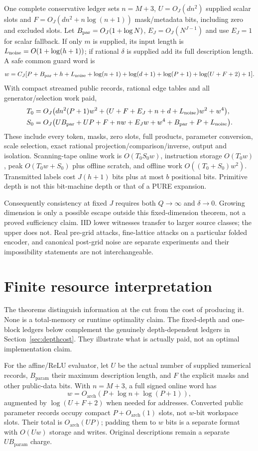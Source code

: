 \documentclass[11pt,letterpaper]{article}
\theoremstyle{definition}\newtheorem{definition}[theorem]{Definition}
\theoremstyle{remark}\newtheorem{remark}[theorem]{Remark}
\begin{document}
One complete conservative ledger sets $n=M+3$, $U=O_J(dn^2)$ supplied scalar slots and $F=O_J(dn^2+n\log(n+1))$ mask/metadata bits, including zero and excluded slots. Let $B_{\rm par}=O_J(1+\log N)$, $E_J=O_J(N^{J-1})$ and use $E_J=1$ for scalar fallback. If only $m$ is supplied, its input length is $L_{\rm noise}=O(1+\log(h+1))$; if rational $\delta$ is supplied add its full description length. A safe common guard word is
\[
 w=C_J[P+B_{\rm par}+h+L_{\rm noise}+\log(n+1)+\log(d+1)
       +\log(P+1)+\log(U+F+2)+1].
\]
With compact streamed public records, rational edge tables and all generator/selection work paid,
\begin{align*}
 T_0&=O_J\bigl(dn^2(P+1)w^2+(U+F+E_J+n+d+L_{\rm noise})w^2+w^4\bigr),\\
 S_0&=O_J\bigl(UB_{\rm par}+UP+F+nw+E_Jw+w^4+B_{\rm par}+P+L_{\rm noise}\bigr).
\end{align*}
These include every token, masks, zero slots, full products, parameter conversion, scale selection, exact rational projection/comparison/inverse, output and isolation. Scanning-tape online work is $O(T_0S_0w)$, instruction storage $O(T_0w)$, peak $O(T_0w+S_0)$ plus offline scratch, and offline work $O((T_0+S_0)w^2)$. Transmitted labels cost $J(h+1)$ bits plus at most $b$ positional bits. Primitive depth is not this bit-machine depth or that of a PURE expansion.

Consequently consistency at fixed $J$ requires both $Q\to\infty$ and $\delta\to0$. Growing dimension is only a possible escape outside this fixed-dimension theorem, not a proved sufficiency claim. IID lower witnesses transfer to larger source classes; the upper does not. Real pre-grid attacks, fine-lattice attacks on a particular folded encoder, and canonical post-grid noise are separate experiments and their impossibility statements are not interchangeable.

\section{Finite resource interpretation}\label{sec:costs}
The theorems distinguish information at the cut from the cost of producing it. None is a total-memory or runtime optimality claim. The fixed-depth and one-block ledgers below complement the genuinely depth-dependent ledgers in Section~\ref{sec:depthcost}. They illustrate what is actually paid, not an optimal implementation claim.

For the affine/ReLU evaluator, let $U$ be the actual number of supplied numerical records, $B_{\mathrm{param}}$ their maximum description length, and $F$ the explicit masks and other public-data bits. With $n=M+3$, a full signed online word has
\[
 w=O_{\mathrm{arch}}(P+\log n+\log(P+1)),
\]
augmented by $\log(U+F+2)$ when needed for addresses. Converted public parameter records occupy compact $P+O_{\mathrm{arch}}(1)$ slots, not $w$-bit workspace slots. Their total is $O_{\mathrm{arch}}(UP)$; padding them to $w$ bits is a separate format with $O(Uw)$ storage and writes. Original descriptions remain a separate $UB_{\mathrm{param}}$ charge.
\end{document}
